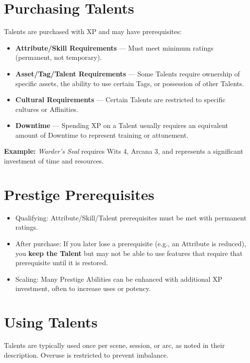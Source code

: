 \section{Purchasing Talents}

Talents are purchased with XP and may have prerequisites:

\begin{itemize}
  \item \textbf{Attribute/Skill Requirements} — Must meet minimum ratings (permanent, not temporary).
  \item \textbf{Asset/Tag/Talent Requirements} — Some Talents require ownership of specific assets, the ability to use certain Tags, or possession of other Talents.
  \item \textbf{Cultural Requirements} — Certain Talents are restricted to specific cultures or Affinities.
  \item \textbf{Downtime} — Spending XP on a Talent usually requires an equivalent amount of Downtime to represent training or attunement.
\end{itemize}

\textbf{Example:} \textit{Warder's Seal} requires Wits 4, Arcana 3, and represents a significant investment of time and resources.

\section{Prestige Prerequisites}

\begin{itemize}
    \item Qualifying: Attribute/Skill/Talent prerequisites must be met with permanent ratings.
    \item After purchase: If you later lose a prerequisite (e.g., an Attribute is reduced), you \textbf{keep the Talent} but may not be able to use features that require that prerequisite until it is restored.
    \item Scaling: Many Prestige Abilities can be enhanced with additional XP investment, often to increase uses or potency.
\end{itemize}

\section{Using Talents}

Talents are typically used once per scene, session, or arc, as noted in their description. Overuse is restricted to prevent imbalance.

